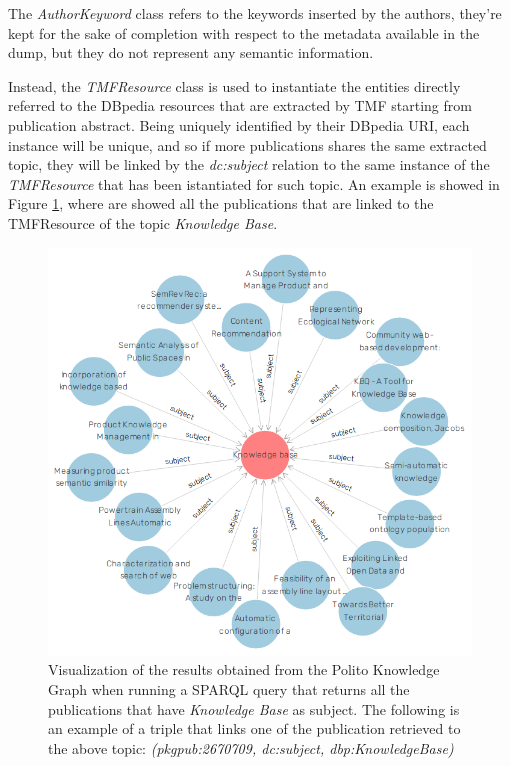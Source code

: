\documentclass[%
    corpo=13.5pt,
    twoside,
    oldstyle,
    tipotesi=magistrale,
    greek,
    evenboxes
]{toptesi}
\begin{document}
The \emph{AuthorKeyword} class refers to the keywords inserted by the authors,
they're kept for the sake of completion with respect to the metadata available
in the dump, but they do not represent any semantic information.

Instead, the \emph{TMFResource} class is used to instantiate the entities
directly referred to the DBpedia resources that are extracted by TMF starting
from publication abstract. Being
uniquely identified by their DBpedia URI, each instance will be unique, and so
if more publications shares the same extracted topic, they will be linked
by the \emph{dc:subject} relation to the same instance of the
\emph{TMFResource} that has been istantiated for such topic. An example is
showed in Figure \ref{fig:subject-knowledge-base}, where are showed all the
publications that are linked to the TMFResource of the
topic \emph{Knowledge Base}.

\begin{figure}[h]
    \centering
    \includegraphics[scale=0.40]{img/subject_knowledge_base.png}
    \caption{Visualization of the results obtained from
        the Polito Knowledge Graph when running a SPARQL query that returns
        all the publications that have \emph{Knowledge Base}
        as subject. The following is an example of a triple that links one of
        the publication retrieved to the above topic:
        \emph{(pkgpub:2670709, dc:subject, dbp:KnowledgeBase)}}
    \label{fig:subject-knowledge-base}
\end{figure}
\end{document}
